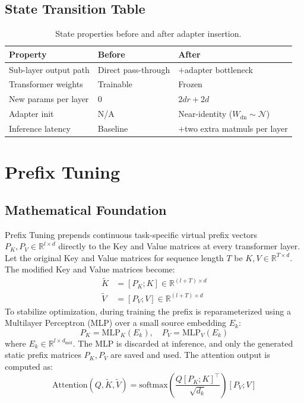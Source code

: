 \subsection{State Transition Table}
\begin{table}[h]\centering
\begin{tabular}{lll}\toprule
\textbf{Property} & \textbf{Before} & \textbf{After}\\\midrule
Sub-layer output path & Direct pass-through & $+$adapter bottleneck\\
Transformer weights & Trainable & Frozen\\
New params per layer & 0 & $2dr + 2d$\\
Adapter init & N/A & Near-identity ($W_{\text{dn}} \sim \mathcal{N}$)\\
Inference latency & Baseline & $+$two extra matmuls per layer\\\bottomrule
\end{tabular}
\caption{State properties before and after adapter insertion.}
\end{table}

\newpage
\section{Prefix Tuning}

\subsection{Mathematical Foundation}
Prefix Tuning prepends continuous task-specific virtual prefix vectors $P_K, P_V \in \mathbb{R}^{l \times d}$ directly to the Key and Value matrices at every transformer layer. Let the original Key and Value matrices for sequence length $T$ be $K, V \in \mathbb{R}^{T \times d}$. The modified Key and Value matrices become:
\begin{align}
  \tilde{K} &= [P_K ; K] \in \mathbb{R}^{(l+T) \times d} \\
  \tilde{V} &= [P_V ; V] \in \mathbb{R}^{(l+T) \times d}
\end{align}
To stabilize optimization, during training the prefix is reparameterized using a Multilayer Perceptron (MLP) over a small source embedding $E_k$:
\begin{equation}
  P_K = \text{MLP}_K(E_k), \quad P_V = \text{MLP}_V(E_k)
\end{equation}
where $E_k \in \mathbb{R}^{l \times d_{\text{mid}}}$. The MLP is discarded at inference, and only the generated static prefix matrices $P_K, P_V$ are saved and used.
The attention output is computed as:
\begin{equation}
  \text{Attention}(Q, \tilde{K}, \tilde{V}) = \text{softmax}\left( \frac{Q [P_K ; K]^\top}{\sqrt{d_k}} \right) [P_V ; V]
\end{equation}

